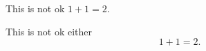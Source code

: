 \documentclass[oneside]{book}
\begin{document}
\begin{mdcell}
This is not ok \(1 + 1 = 2\).
\end{mdcell}


\begin{mdcell}
This is not ok either \[1 + 1 = 2.\]
\end{mdcell}

\ifPythonTeXLoaded
\else
\fi
\end{document}
